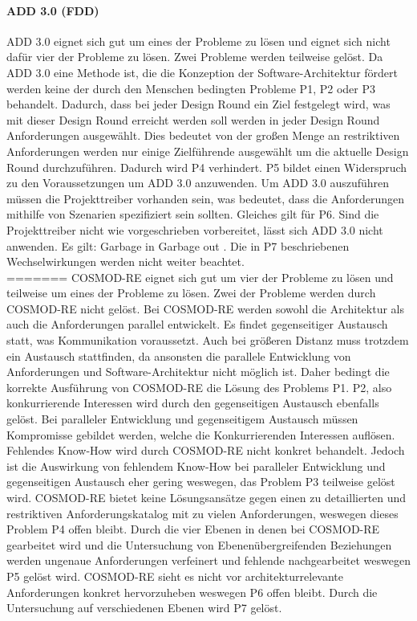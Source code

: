\paragraph{ADD 3.0 (FDD)}
ADD 3.0 eignet sich gut um eines der Probleme zu lösen und eignet sich nicht dafür vier der Probleme zu lösen. Zwei Probleme werden teilweise gelöst. Da ADD 3.0 eine Methode ist, die die Konzeption der Software-Architektur fördert werden keine der durch den Menschen bedingten Probleme P1, P2 oder P3 behandelt. Dadurch, dass bei jeder Design Round ein Ziel festgelegt wird, was mit dieser Design Round erreicht werden soll werden in jeder Design Round Anforderungen ausgewählt. Dies bedeutet von der großen Menge an restriktiven Anforderungen werden nur einige Zielführende ausgewählt um die aktuelle Design Round durchzuführen. Dadurch wird P4 verhindert. P5 bildet einen Widerspruch zu den Voraussetzungen um ADD 3.0 anzuwenden. Um ADD 3.0 auszuführen müssen die Projekttreiber vorhanden sein, was bedeutet, dass die Anforderungen mithilfe von Szenarien spezifiziert sein sollten. Gleiches gilt für P6. Sind die Projekttreiber nicht wie vorgeschrieben vorbereitet, lässt sich ADD 3.0 nicht anwenden. Es gilt: Garbage in Garbage out \cite{Cer01}. Die in P7 beschriebenen Wechselwirkungen werden nicht weiter beachtet.\\
=======
COSMOD-RE eignet sich gut um vier der Probleme zu l\"osen und teilweise um eines der Probleme zu l\"osen. Zwei der Probleme werden durch COSMOD-RE nicht gel\"ost. Bei COSMOD-RE werden sowohl die Architektur als auch die Anforderungen parallel entwickelt. Es findet gegenseitiger Austausch statt, was Kommunikation voraussetzt. Auch bei gr\"o\ss{}eren Distanz muss trotzdem ein Austausch stattfinden, da ansonsten die parallele Entwicklung von Anforderungen und Software-Architektur nicht m\"oglich ist. Daher bedingt die korrekte Ausf\"uhrung von COSMOD-RE die L\"osung des Problems P1. P2, also konkurrierende Interessen wird durch den gegenseitigen Austausch ebenfalls gel\"ost. Bei paralleler Entwicklung und gegenseitigem Austausch m\"ussen Kompromisse gebildet werden, welche die Konkurrierenden Interessen aufl\"osen. Fehlendes Know-How wird durch COSMOD-RE nicht konkret behandelt. Jedoch ist die Auswirkung von fehlendem Know-How bei paralleler Entwicklung und gegenseitigen Austausch eher gering weswegen, das Problem P3 teilweise gel\"ost wird. COSMOD-RE bietet keine L\"osungsans\"atze gegen einen zu detaillierten und restriktiven Anforderungskatalog mit zu vielen Anforderungen, weswegen dieses Problem P4 offen bleibt. Durch die vier Ebenen in denen bei COSMOD-RE gearbeitet wird und die Untersuchung von Ebenen\"ubergreifenden Beziehungen werden ungenaue Anforderungen verfeinert und fehlende nachgearbeitet weswegen P5 gel\"ost wird. COSMOD-RE sieht es nicht vor architekturrelevante Anforderungen konkret hervorzuheben weswegen P6 offen bleibt. Durch die Untersuchung auf verschiedenen Ebenen wird P7 gel\"ost.\\


